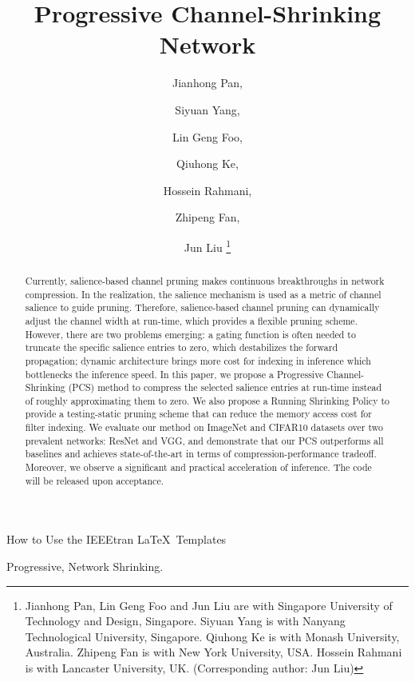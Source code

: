 \documentclass[lettersize,journal]{IEEEtran}
\begin{document}
\title{Progressive Channel-Shrinking Network}
\author{Jianhong Pan, \and
Siyuan Yang, \and
Lin Geng Foo, \and
Qiuhong Ke, \and
Hossein Rahmani, \and
Zhipeng Fan, \and
Jun Liu
\thanks{Jianhong Pan, Lin Geng Foo and Jun Liu are with Singapore University of Technology and Design, Singapore.
Siyuan Yang is with Nanyang Technological University, Singapore.
Qiuhong Ke is with Monash University, Australia.
Zhipeng Fan is with New York University, USA.
Hossein Rahmani is with Lancaster University, UK.
(Corresponding author: Jun Liu)
}
}



%
{How to Use the IEEEtran \LaTeX \ Templates}

\maketitle

\begin{abstract}
Currently, salience-based channel pruning makes continuous breakthroughs in network compression. In the realization, the salience mechanism is used as a metric of channel salience to guide pruning. Therefore, salience-based channel pruning can dynamically adjust the channel width at run-time, which provides a flexible pruning scheme. However, there are two problems emerging: a gating function is often needed to truncate the specific salience entries to zero, which destabilizes the forward propagation; dynamic architecture brings more cost for indexing in inference which bottlenecks the inference speed. In this paper, we propose a Progressive Channel-Shrinking (PCS) method to compress the selected salience entries at run-time instead of roughly approximating them to zero. We also propose a Running Shrinking Policy to provide a testing-static pruning scheme that can reduce the memory access cost for filter indexing. We evaluate our method on ImageNet and CIFAR10 datasets over two prevalent networks: ResNet and VGG, and demonstrate that our PCS outperforms all baselines and achieves state-of-the-art in terms of compression-performance tradeoff. Moreover, we observe a significant and practical acceleration of inference. The code will be released upon acceptance.
\end{abstract}

\begin{IEEEkeywords}
Progressive, Network Shrinking.
\end{IEEEkeywords}
\end{document}
